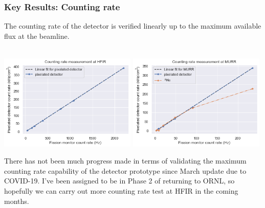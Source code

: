 \documentclass[xcolor=x11names, compress, handout]{beamer}
\renewcommand{\(}{\begin{columns}}
\renewcommand{\)}{\end{columns}}
\newcommand{\<}[1]{\begin{column}{#1}}
\renewcommand{\>}{\end{column}}
\begin{document}
\begin{frame}
  \frametitle{Key Results: Counting rate}
  The counting rate of the detector is verified linearly up to the maximum available flux at the beamline.\\
  \

  \includegraphics[width=0.49\textwidth]{images/counting_rate_HFIR.png}
  \includegraphics[width=0.49\textwidth]{images/counting_rate_MURR.png}

  \scriptsize There has not been much progress made in terms of validating the maximum counting rate capability of the detector prototype since March update due to COVID-19. 
  I've been assigned to be in Phase 2 of returning to ORNL, so hopefully we can carry out more counting rate test at HFIR in the coming months.
\end{frame}
\end{document}
